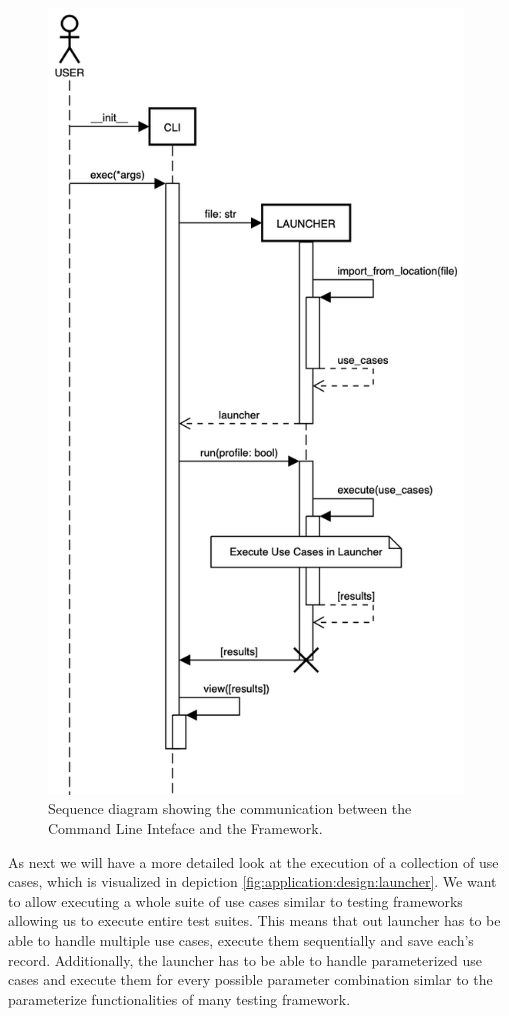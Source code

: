 \begin{figure}[h]
    \centering
    \includegraphics[width=11cm]{resources/img/sequence/cli}
    \caption{
        Sequence diagram showing the communication between the Command Line
        Inteface and the Framework.
    }
    \label{fig:application:design:cli}
\end{figure}

As next we will have a more detailed look at the execution of a collection of
use cases, which is visualized in depiction
\ref{fig:application:design:launcher}. We want to allow executing a whole suite
of use cases similar to testing frameworks allowing us to execute entire test
suites. This means that out launcher has to be able to handle multiple use
cases, execute them sequentially and save each's record. Additionally, the
launcher has to be able to handle parameterized use cases and execute them for
every possible parameter combination simlar to the parameterize functionalities
of many testing framework. 

